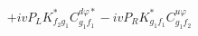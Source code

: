 %
\begin{dmath*}
%
  +  i v P_L K_{f_2 g_1}^* C^{d \varphi  *}_{g_1 f_1}  -  i v P_R K_{g_1 f_1}^* C^{u \varphi  }_{g_1 f_2}
%
\end{dmath*}
%

